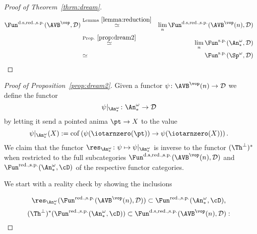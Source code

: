 \begin{proof}[Proof of Theorem~\ref{thrm:dream}]
    \begin{eqnarray*}   
        \Fun^{\mathrm{d.s,red.,s.p.}}(\AVB^\vop, \mathcal D) & \stackrel{\mathrm{Lemma}~\ref{lemma:reduction}}{\simeq} & \lim_n 
        \Fun^{\mathrm{d.s,red.,s.p.}}(\AVB^\vop(n), \mathcal D) \\
        & \stackrel{\mathrm{Prop.}~\ref{prop:dream2}}{\simeq} & \lim_n \Fun^{\mathrm{s.p.}}(\An_*^\omega, \mathcal D) \\
        & \simeq & \Fun^{\mathrm{s.p.}}(\Sp^\omega, \mathcal D)
    \end{eqnarray*} 
\end{proof}
\begin{proof}[Proof of Proposition~\ref{prop:dream2}]
    Given a functor $\psi \colon \AVB^\vop(n) \to \mathcal D$ we define 
    the functor 
    \[
    \psi|_{\An_*^\omega} \colon \An_*^\omega \to \mathcal D    
    \]
    by letting it send a pointed anima $\pt \to X$ to the value 
    \[
    \psi|_{\An_*^\omega}(X) := \mathrm{cof}\left( \psi(\iotarnzero(\pt))\to \psi(\iotarnzero(X))\right).  
    \]
    We claim that the functor $\res_{\An_*^\omega} \colon \psi \mapsto \psi|_{\An_*^\omega}$ is inverse to the functor $(\Th^\perp)^*$ when restricted to 
    the full subcategories 
    $\Fun^{\mathrm{d.s,red.,s.p.}}(\AVB^\vop(n), \mathcal D)$ and 
    $\Fun^{\mathrm{red.,s.p.}}(\An_*^\omega, \cD)$ of the respective functor categories.

    We start with a reality check by showing the inclusions 
    
        \[ 
            \res_{\An_*^\omega}(\Fun^{\mathrm{red.,s.p.}}(\AVB^\vop(n), \mathcal D)) \subset \Fun^{\mathrm{red.,s.p.}}(\An_*^\omega, \cD),
        \]
         \[
            (\Th^\perp)^*(\Fun^{\mathrm{red.,s.p.}}(\An_*^\omega, \cD)) \subset \Fun^{\mathrm{d.s,red.,s.p.}}(\AVB^\vop(n), \mathcal D):
        \]



\end{proof}

